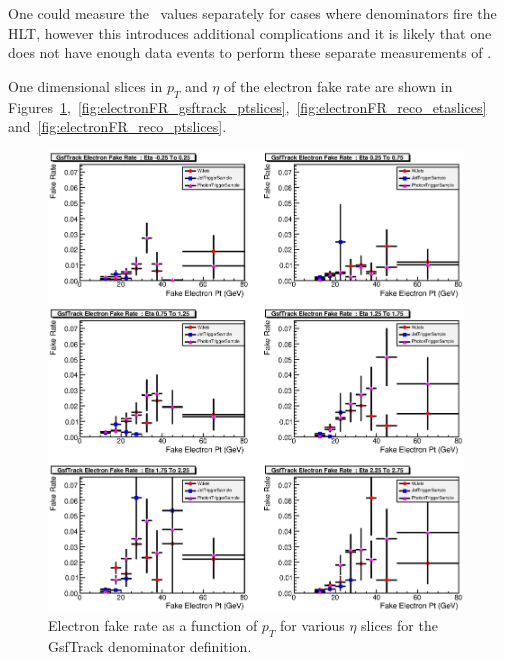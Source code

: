 \documentclass{cmspaper}
\begin{document}
One could measure the \epsilonFake~values separately for cases where denominators fire the HLT, however this introduces additional complications and it is likely that one does not have enough data events to perform these separate measurements of \epsilonFake.

\label{app:electronfakerates}

One dimensional slices in $p_T$ and $\eta$ of the electron fake rate are shown in Figures~\ref{fig:electronFR_gsftrack_etaslices},~\ref{fig:electronFR_gsftrack_ptslices},~\ref{fig:electronFR_reco_etaslices} 
and~\ref{fig:electronFR_reco_ptslices}.

\begin{figure}[htb]
\begin{center}
\includegraphics[width=0.98\textwidth]{plots/GsfTrackElectronFakeRateEtaSlices.eps}
   \caption{Electron fake rate as a function of $p_T$ for various $\eta$ slices for the GsfTrack denominator definition. }
   \label{fig:electronFR_gsftrack_etaslices}
\end{center}
\end{figure}
\end{document}
